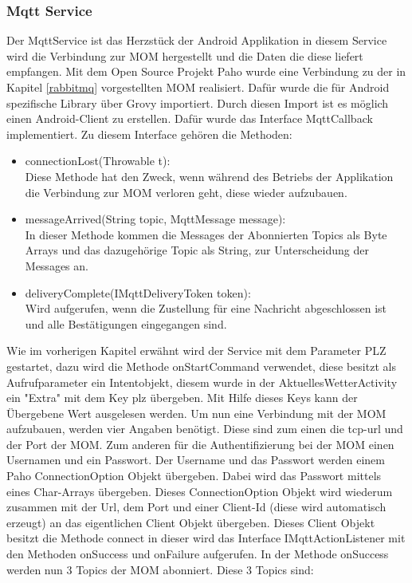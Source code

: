 \subsubsection{Mqtt Service}
\label{subsubsec:MqttService}
Der MqttService ist das Herzstück der Android Applikation in diesem Service wird die Verbindung zur MOM hergestellt und die Daten die diese liefert empfangen.
Mit dem Open Source Projekt Paho wurde eine Verbindung zu der in Kapitel \ref{rabbitmq} vorgestellten MOM realisiert. Dafür wurde die für Android spezifische Library über Grovy importiert. Durch diesen Import ist es möglich einen Android-Client zu erstellen. Dafür wurde das Interface MqttCallback implementiert. Zu diesem Interface gehören die Methoden: 
 \begin{itemize}
\item connectionLost(Throwable t):
\\Diese Methode hat den Zweck, wenn während des Betriebs der Applikation die Verbindung zur MOM verloren geht, diese wieder aufzubauen.
\item messageArrived(String topic, MqttMessage message):
\\In dieser Methode kommen die Messages der Abonnierten Topics als Byte Arrays und das dazugehörige Topic als String, zur Unterscheidung der Messages an.
\item deliveryComplete(IMqttDeliveryToken token):
\\Wird aufgerufen, wenn die Zustellung für eine Nachricht abgeschlossen ist und alle Bestätigungen eingegangen sind.
\end{itemize}
Wie im vorherigen Kapitel erwähnt wird der Service mit dem Parameter PLZ gestartet, dazu wird die Methode onStartCommand verwendet, diese besitzt als Aufrufparameter ein Intentobjekt, diesem wurde in der AktuellesWetterActivity ein "Extra" mit dem Key plz übergeben. Mit Hilfe dieses Keys kann der Übergebene Wert ausgelesen werden. Um nun eine Verbindung mit der MOM aufzubauen, werden vier Angaben benötigt. Diese sind zum einen die tcp-url und der Port der MOM. Zum anderen für die Authentifizierung bei der MOM einen Usernamen und ein Passwort. Der Username und das Passwort werden einem Paho ConnectionOption Objekt übergeben. Dabei wird das Passwort mittels eines Char-Arrays übergeben. Dieses ConnectionOption Objekt wird wiederum zusammen mit der Url, dem Port und einer Client-Id (diese wird automatisch erzeugt) an das eigentlichen Client Objekt übergeben. Dieses Client Objekt besitzt die Methode connect in dieser wird das Interface IMqttActionListener mit den Methoden onSuccess und onFailure aufgerufen. In der Methode onSuccess werden nun 3 Topics der MOM abonniert. Diese 3 Topics sind:
